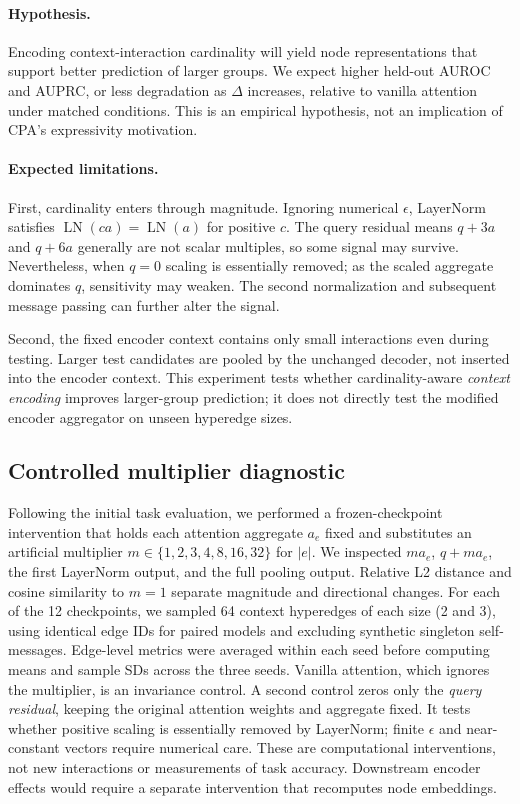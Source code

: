 \documentclass{article}
\begin{document}
\paragraph{Hypothesis.}
Encoding context-interaction cardinality will yield node representations that support better prediction of larger groups. We expect higher held-out AUROC and AUPRC, or less degradation as $\Delta$ increases, relative to vanilla attention under matched conditions. This is an empirical hypothesis, not an implication of CPA's expressivity motivation.

\paragraph{Expected limitations.}
First, cardinality enters through magnitude. Ignoring numerical $\epsilon$, LayerNorm satisfies $\operatorname{LN}(c a)=\operatorname{LN}(a)$ for positive $c$. The query residual means $q+3a$ and $q+6a$ generally are not scalar multiples, so some signal may survive. Nevertheless, when $q=0$ scaling is essentially removed; as the scaled aggregate dominates $q$, sensitivity may weaken. The second normalization and subsequent message passing can further alter the signal.

Second, the fixed encoder context contains only small interactions even during testing. Larger test candidates are pooled by the unchanged decoder, not inserted into the encoder context. This experiment tests whether cardinality-aware \emph{context encoding} improves larger-group prediction; it does not directly test the modified encoder aggregator on unseen hyperedge sizes.

\subsection{Controlled multiplier diagnostic}
Following the initial task evaluation, we performed a frozen-checkpoint intervention that holds each attention aggregate $a_e$ fixed and substitutes an artificial multiplier $m\in\{1,2,3,4,8,16,32\}$ for $|e|$. We inspected $m a_e$, $q+m a_e$, the first LayerNorm output, and the full pooling output. Relative L2 distance and cosine similarity to $m=1$ separate magnitude and directional changes. For each of the 12 checkpoints, we sampled 64 context hyperedges of each size (2 and 3), using identical edge IDs for paired models and excluding synthetic singleton self-messages. Edge-level metrics were averaged within each seed before computing means and sample SDs across the three seeds. Vanilla attention, which ignores the multiplier, is an invariance control. A second control zeros only the \emph{query residual}, keeping the original attention weights and aggregate fixed. It tests whether positive scaling is essentially removed by LayerNorm; finite $\epsilon$ and near-constant vectors require numerical care. These are computational interventions, not new interactions or measurements of task accuracy. Downstream encoder effects would require a separate intervention that recomputes node embeddings.
\end{document}
